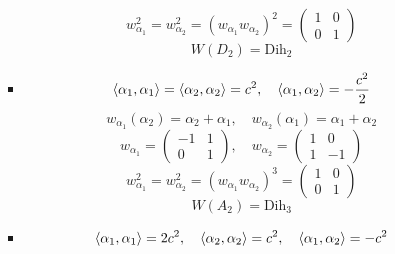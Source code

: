 \documentclass[12pt]{article}
\theoremstyle{definition}
\begin{document}
\begin{enumerate}
\begin{itemize}
\begin{itemize}
            \begin{equation}
                w^2_{\alpha_1}=w^2_{\alpha_2}=(w_{\alpha_1}w_{\alpha_2})^2=\begin{pmatrix}
                    1 & 0\\
                    0 & 1
                \end{pmatrix}
            \end{equation}
            \begin{equation}
                \boxed{W(D_2)=\text{Dih}_2}
            \end{equation}
            \item
            \begin{equation}
                \braket{\alpha_1,\alpha_1}=\braket{\alpha_2,\alpha_2}=c^2,\quad\braket{\alpha_1,\alpha_2}=-\frac{c^2}{2}
            \end{equation}
            \begin{equation}
                w_{\alpha_1}(\alpha_2)=\alpha_2+\alpha_1,\quad w_{\alpha_2}(\alpha_1)=\alpha_1+\alpha_2
            \end{equation}
            \begin{equation}
                w_{\alpha_1}=\begin{pmatrix}
                    -1 & 1\\
                    0 & 1
                \end{pmatrix},\quad w_{\alpha_2}=\begin{pmatrix}
                    1 & 0\\
                    1 & -1
                \end{pmatrix}
            \end{equation}
            \begin{equation}
                w^2_{\alpha_1}=w^2_{\alpha_2}=(w_{\alpha_1}w_{\alpha_2})^3=\begin{pmatrix}
                    1 & 0\\
                    0 & 1
                \end{pmatrix}
            \end{equation}
            \begin{equation}
                \boxed{W(A_2)=\text{Dih}_3}
            \end{equation}
            \item
            \begin{equation}
                \braket{\alpha_1,\alpha_1}=2c^2,\quad\braket{\alpha_2,\alpha_2}=c^2,\quad\braket{\alpha_1,\alpha_2}=-c^2

\end{equation}
\end{itemize}
\end{itemize}
\end{enumerate}
\end{document}
